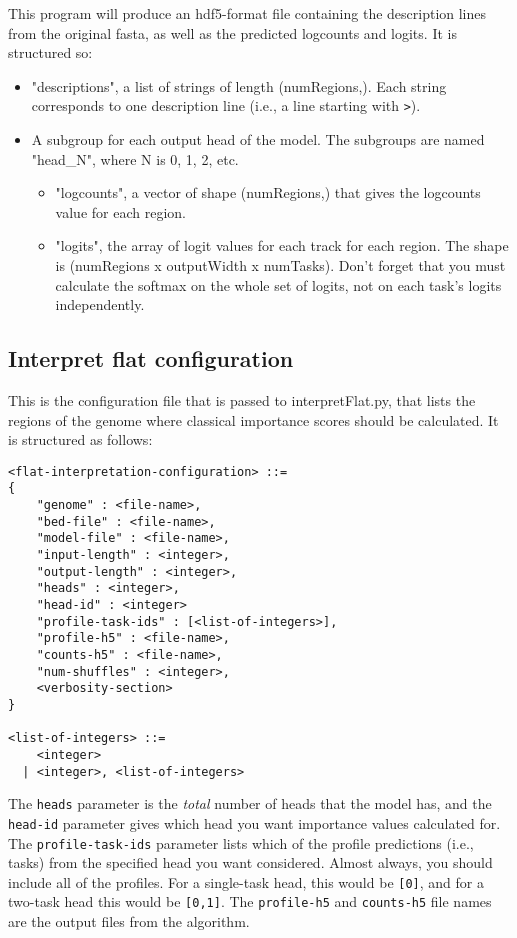 \documentclass{article}
\begin{document}
This program will produce an hdf5-format file containing the description lines from the original fasta, as well as the predicted logcounts and logits.
It is structured so:

\begin{itemize}
    \item "descriptions", a list of strings of length (numRegions,). Each string corresponds to one description line (i.e., a line starting with \texttt{>}). 
    \item A subgroup for each output head of the model. The subgroups are named "head\_N", where N is 0, 1, 2, etc. 
        \begin{itemize}
            \item "logcounts", a vector of shape (numRegions,) that gives the logcounts value for each region. 
            \item "logits", the array of logit values for each track for each region. The shape is (numRegions x outputWidth x numTasks). Don't forget that you must calculate the softmax on the whole set of logits, not on each task's logits independently.
        \end{itemize} 
\end{itemize}

\subsection{Interpret flat configuration}
This is the configuration file that is passed to interpretFlat.py, that lists the regions of the genome where classical importance scores should be calculated. It is structured as follows:

\begin{lstlisting}
<flat-interpretation-configuration> ::=
{
    "genome" : <file-name>,
    "bed-file" : <file-name>,
    "model-file" : <file-name>,
    "input-length" : <integer>,
    "output-length" : <integer>,
    "heads" : <integer>,
    "head-id" : <integer>
    "profile-task-ids" : [<list-of-integers>],
    "profile-h5" : <file-name>,
    "counts-h5" : <file-name>,
    "num-shuffles" : <integer>,
    <verbosity-section>
}

<list-of-integers> ::=
    <integer>
  | <integer>, <list-of-integers>

\end{lstlisting}

The \texttt{heads} parameter is the \emph{total} number of heads that the model has, and the \texttt{head-id} parameter gives which head you want importance values calculated for. 
The \texttt{profile-task-ids} parameter lists which of the profile predictions (i.e., tasks) from the specified head you want considered. Almost always, you should include all of the profiles. For a single-task head, this would be \texttt{[0]}, and for a two-task head this would be \texttt{[0,1]}.
The \texttt{profile-h5} and \texttt{counts-h5} file names are the output files from the algorithm. 
\end{document}
